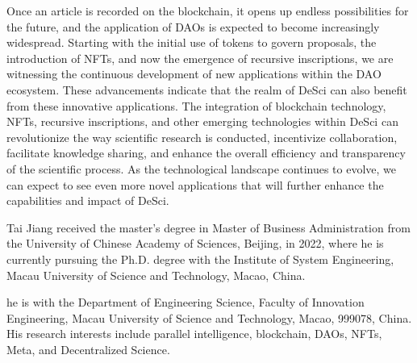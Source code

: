\documentclass[lettersize,journal]{IEEEtran}
\begin{document}

Once an article is recorded on the blockchain, it opens up endless possibilities for the future, and the application of DAOs is expected to become increasingly widespread. Starting with the initial use of tokens to govern proposals, the introduction of NFTs, and now the emergence of recursive inscriptions, we are witnessing the continuous development of new applications within the DAO ecosystem. 
These advancements indicate that the realm of DeSci can also benefit from these innovative applications. The integration of blockchain technology, NFTs, recursive inscriptions, and other emerging technologies within DeSci can revolutionize the way scientific research is conducted, incentivize collaboration, facilitate knowledge sharing, and enhance the overall efficiency and transparency of the scientific process. As the technological landscape continues to evolve, we can expect to see even more novel applications that will further enhance the capabilities and impact of DeSci.






\newpage

 

\begin{IEEEbiography}{Tai Jiang}
  received the master’s degree in Master of Business Administration from the University of Chinese Academy of Sciences, Beijing, in 2022, where he is currently pursuing the Ph.D. degree with the Institute of System Engineering, Macau University of Science and Technology, Macao, China.
  
  he is with the Department of Engineering Science, Faculty of Innovation Engineering, Macau University of Science and Technology, Macao, 999078, China. His research interests include parallel intelligence, blockchain, DAOs, NFTs, Meta, and Decentralized Science.
\end{IEEEbiography}
\end{document}
